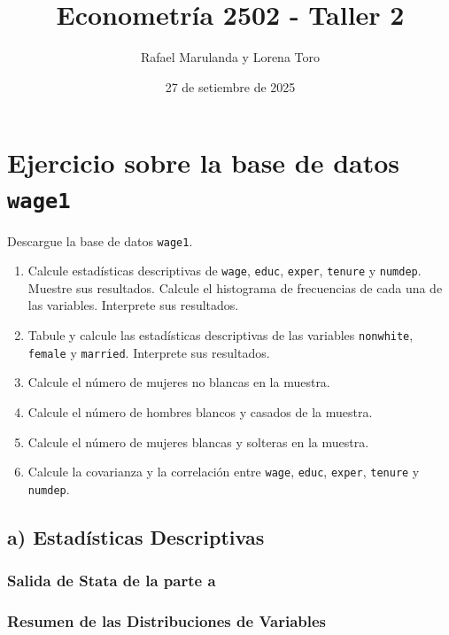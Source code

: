 \documentclass[12pt]{article}
\title{Econometría 2502 - Taller 2}
\author{Rafael Marulanda y Lorena Toro}
\date{27 de setiembre de 2025}
\begin{document}
\maketitle

\section{Ejercicio sobre la base de datos \texttt{wage1}}

Descargue la base de datos \texttt{wage1}.

\begin{enumerate}[label=\alph*)]
    \item Calcule estadísticas descriptivas de \texttt{wage}, \texttt{educ}, \texttt{exper}, \texttt{tenure} y \texttt{numdep}. Muestre sus resultados. Calcule el histograma de frecuencias de cada una de las variables. Interprete sus resultados.
    
    \item Tabule y calcule las estadísticas descriptivas de las variables \texttt{nonwhite}, \texttt{female} y \texttt{married}. Interprete sus resultados.
    
    \item Calcule el número de mujeres no blancas en la muestra.
    
    \item Calcule el número de hombres blancos y casados de la muestra.
    
    \item Calcule el número de mujeres blancas y solteras en la muestra.
    
    \item Calcule la covarianza y la correlación entre \texttt{wage}, \texttt{educ}, \texttt{exper}, \texttt{tenure} y \texttt{numdep}.
\end{enumerate}

\subsection*{a) Estadísticas Descriptivas}

\subsubsection*{Salida de Stata de la parte a}



\subsubsection*{Resumen de las Distribuciones de Variables}
\end{document}
